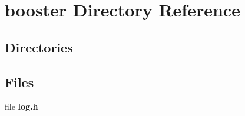 \section{booster Directory Reference}
\label{dir_84328363ceaa5686f2cc6e88d283e19a}
\subsection*{Directories}
\begin{DoxyCompactItemize}
\end{DoxyCompactItemize}
\subsection*{Files}
\begin{DoxyCompactItemize}
\item 
file {\bf log.\+h}
\end{DoxyCompactItemize}
